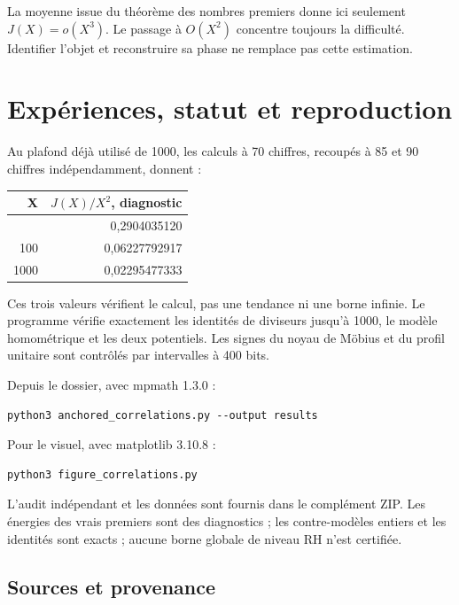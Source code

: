 \documentclass[
  11pt,
]{article}
\begin{document}
La moyenne issue du théorème des nombres premiers donne ici seulement
\(J(X)=o(X^3)\). Le passage à \(O(X^2)\) concentre toujours la
difficulté. Identifier l'objet et reconstruire sa phase ne remplace pas
cette estimation.

\hypertarget{expuxe9riences-statut-et-reproduction}{%
\section{Expériences, statut et
reproduction}\label{expuxe9riences-statut-et-reproduction}}

Au plafond déjà utilisé de 1000, les calculs à 70 chiffres, recoupés à
85 et 90 chiffres indépendamment, donnent :

\begin{longtable}[]{@{}rr@{}}
\toprule\noalign{}
X & \(J(X)/X^2\), diagnostic \\
\midrule\noalign{}
\endhead
\bottomrule\noalign{}
\endlastfoot
10 & 0,2904035120 \\
100 & 0,06227792917 \\
1000 & 0,02295477333 \\
\end{longtable}

Ces trois valeurs vérifient le calcul, pas une tendance ni une borne
infinie. Le programme vérifie exactement les identités de diviseurs
jusqu'à 1000, le modèle homométrique et les deux potentiels. Les signes
du noyau de Möbius et du profil unitaire sont contrôlés par intervalles
à 400 bits.

Depuis le dossier, avec mpmath 1.3.0 :

\begin{verbatim}
python3 anchored_correlations.py --output results
\end{verbatim}

Pour le visuel, avec matplotlib 3.10.8 :

\begin{verbatim}
python3 figure_correlations.py
\end{verbatim}

L'audit indépendant et les données sont fournis dans le complément ZIP.
Les énergies des vrais premiers sont des diagnostics ; les
contre-modèles entiers et les identités sont exacts ; aucune borne
globale de niveau RH n'est certifiée.

\hypertarget{sources-et-provenance}{%
\subsection{Sources et provenance}\label{sources-et-provenance}}
\end{document}

